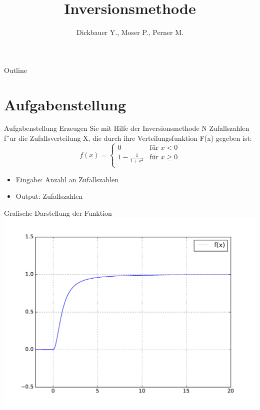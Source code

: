 

\title[BSP16 - Inversionsmethode]{Inversionsmethode}
\author{Dickbauer Y., Moser P., Perner M.}



\begin{frame}
  \titlepage
\end{frame}

\begin{frame}{Outline}
  \tableofcontents
\end{frame}

\section{Aufgabenstellung}
\begin{frame}{Aufgabenstellung}
Erzeugen Sie mit Hilfe der Inversionsmethode N Zufallszahlen f¨ur die Zufallsverteilung
X, die durch ihre Verteilungsfunktion F(x) gegeben ist:
\begin{equation}
   f(x) =
   \begin{cases}
     0 & \text{für } x < 0 \\
     1 - \frac{1}{1+x^2} & \text{für } x \geq 0 \\
   \end{cases}
\end{equation}
\begin{itemize}
  \item Eingabe: Anzahl an Zufallszahlen
  \item Output: Zufallszahlen
\end{itemize}

\end{frame}

\begin{frame}{Grafische Darstellung der Funktion}
	\centering
  	\includegraphics[scale=0.5]{BSP16_plot_function.pdf}
\end{frame} 

